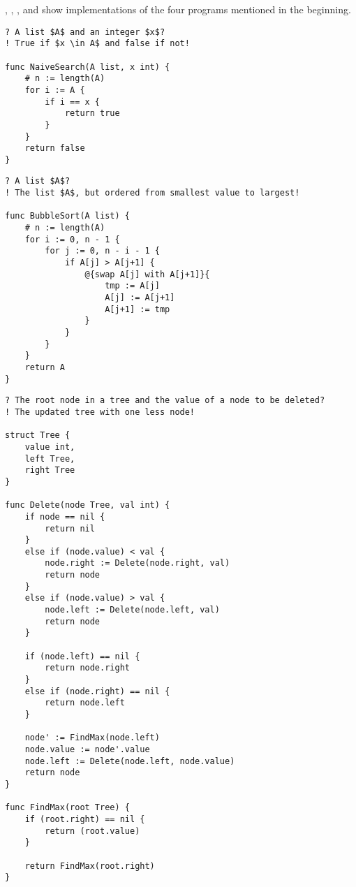 , , , and  show implementations of the four programs mentioned in the beginning. \\


\begin{lstlisting}[caption={Naive search implementation in Gourmet.}, captionpos=b, label={naiveSearchGourmet}]
? A list $A$ and an integer $x$?
! True if $x \in A$ and false if not!

func NaiveSearch(A list, x int) {
    # n := length(A)
    for i := A {
        if i == x {
            return true
        }
    }
    return false
}
\end{lstlisting}

\begin{lstlisting}[caption={Bubble sort implementation in Gourmet.}, captionpos=b, label={bubbleSortGourmet}]
? A list $A$?
! The list $A$, but ordered from smallest value to largest!

func BubbleSort(A list) {
    # n := length(A)
    for i := 0, n - 1 {
        for j := 0, n - i - 1 {
            if A[j] > A[j+1] {
                @{swap A[j] with A[j+1]}{
                    tmp := A[j]
                    A[j] := A[j+1]
                    A[j+1] := tmp
                }
            }
        }
    }
    return A
}
\end{lstlisting}

\begin{lstlisting}[caption={Deletion in binary search tree implementation in Gourmet.}, captionpos=b, label={deleteBSTGourmet}]
? The root node in a tree and the value of a node to be deleted?
! The updated tree with one less node!

struct Tree {
    value int,
    left Tree,
    right Tree
}

func Delete(node Tree, val int) {
    if node == nil {
        return nil
    }
    else if (node.value) < val {
        node.right := Delete(node.right, val)
        return node
    }
    else if (node.value) > val {
        node.left := Delete(node.left, val)
        return node
    }

    if (node.left) == nil {
        return node.right
    }
    else if (node.right) == nil {
        return node.left
    }

    node' := FindMax(node.left)
    node.value := node'.value
    node.left := Delete(node.left, node.value)
    return node
}

func FindMax(root Tree) {
    if (root.right) == nil {
        return (root.value)
    }

    return FindMax(root.right)
}
\end{lstlisting}

